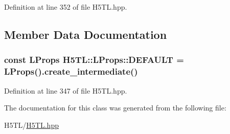 Definition at line 352 of file H5\-T\-L.\-hpp.



\subsection{Member Data Documentation}
\hypertarget{class_h5_t_l_1_1_l_props_a422b3afe8a1bdb74252157d7c0ae7d9b}{
\subsubsection[{D\-E\-F\-A\-U\-L\-T}]{\setlength{\rightskip}{0pt plus 5cm}const {\bf L\-Props} H5\-T\-L\-::\-L\-Props\-::\-D\-E\-F\-A\-U\-L\-T = {\bf L\-Props}().{\bf create\-\_\-intermediate}()\hspace{0.3cm}{\ttfamily [static]}}}\label{class_h5_t_l_1_1_l_props_a422b3afe8a1bdb74252157d7c0ae7d9b}


Definition at line 347 of file H5\-T\-L.\-hpp.



The documentation for this class was generated from the following file\-:\begin{DoxyCompactItemize}
\item 
H5\-T\-L/\hyperlink{_h5_t_l_8hpp}{H5\-T\-L.\-hpp}\end{DoxyCompactItemize}
